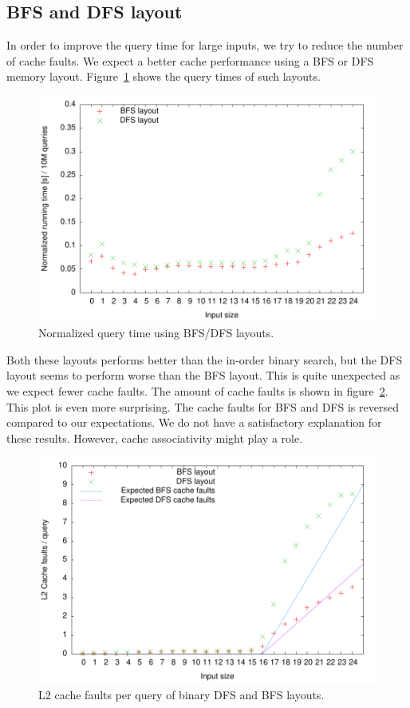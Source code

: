 \subsection{BFS and DFS layout}
In order to improve the query time for large inputs, we try to
reduce the number of cache faults. We expect a better cache
performance using a BFS or DFS memory
layout. Figure~\ref{fig:bfs_dfs_runningtime} shows the query times of
such layouts.
\begin{figure}[h!]
  \centering
  \includegraphics[width=\textwidth]{../week1/plots/outputs/bfs_dfs_runningtime}
  \caption{Normalized query time using BFS/DFS layouts.}
  \label{fig:bfs_dfs_runningtime}
\end{figure}
Both these layouts performs better than the in-order binary search,
but the DFS layout seems to perform worse than the BFS layout. This is quite unexpected as we expect fewer cache faults. The amount of cache faults is shown in figure~\ref{fig:bfs_dfs_cachefaults}. This plot is even more surprising. The cache faults for BFS and DFS is reversed compared to our expectations. We do not have a satisfactory explanation for these results. However, cache associativity might play a role.


\begin{figure}[h!]
  \centering
  \includegraphics[width=\textwidth]{../week1/plots/outputs/bfs_dfs_cachefaults}
  \caption{L2 cache faults per query of binary DFS and BFS layouts.}
    \label{fig:bfs_dfs_cachefaults}
\end{figure}

